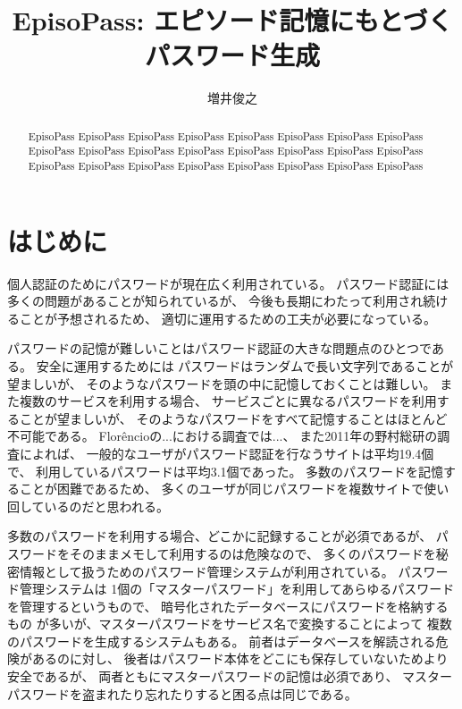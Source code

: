 \documentclass[twoside]{wiss}
\begin{document}
\title{EpisoPass: エピソード記憶にもとづくパスワード生成}

\author{増井俊之}

\begin{abstract}
EpisoPass EpisoPass EpisoPass EpisoPass EpisoPass EpisoPass 
EpisoPass EpisoPass EpisoPass EpisoPass EpisoPass EpisoPass 
EpisoPass EpisoPass EpisoPass EpisoPass EpisoPass EpisoPass 
EpisoPass EpisoPass EpisoPass EpisoPass EpisoPass EpisoPass 
\end{abstract}

\maketitle

\section{はじめに}

個人認証のためにパスワードが現在広く利用されている。
パスワード認証には多くの問題があることが知られているが\cite{増井_ユニマガ}、
今後も長期にわたって利用され続けることが予想されるため、
適切に運用するための工夫が必要になっている。

パスワードの記憶が難しいことはパスワード認証の大きな問題点のひとつである。
安全に運用するためには
パスワードはランダムで長い文字列であることが望ましいが、
そのようなパスワードを頭の中に記憶しておくことは難しい。
また複数のサービスを利用する場合、
サービスごとに異なるパスワードを利用することが望ましいが、
そのようなパスワードをすべて記憶することはほとんど不可能である。
%
Flor\^{e}ncioの...における調査では...\cite{Florencio:2007:LSW:1242572.1242661}、
また2011年の野村総研の調査によれば、
一般的なユーザがパスワード認証を行なうサイトは平均19.4個で、
利用しているパスワードは平均3.1個であった\cite{野村総研}。
多数のパスワードを記憶することが困難であるため、
多くのユーザが同じパスワードを複数サイトで使い回しているのだと思われる。

多数のパスワードを利用する場合、どこかに記録することが必須であるが、
パスワードをそのままメモして利用するのは危険なので、
多くのパスワードを秘密情報として扱うためのパスワード管理システムが利用されている。
パスワード管理システムは
1個の「マスターパスワード」を利用してあらゆるパスワードを管理するというもので、
暗号化されたデータベースにパスワードを格納するもの%
\cite{OnePassword}%
\cite{Dashlane}%
\cite{ミルパス}%
\cite{LastPass}%
\cite{KeyPass}%
\cite{NortonIDSafe}%
\cite{IDManager}%
が多いが、マスターパスワードをサービス名で変換することによって
複数のパスワードを生成するシステム\cite{SuperGenPass}もある。
前者はデータベースを解読される危険があるのに対し、
後者はパスワード本体をどこにも保存していないためより安全であるが、
両者ともにマスターパスワードの記憶は必須であり、
マスターパスワードを盗まれたり忘れたりすると困る点は同じである。
\end{document}
